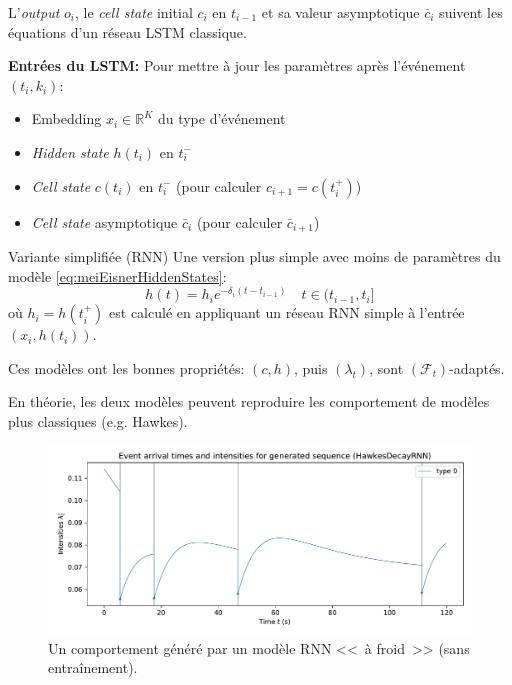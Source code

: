 \documentclass{beamer}
\newcommand{\RR}{\mathbb{R}}
\begin{document}
\begin{frame}
L'\textit{output} $o_i$, le \textit{cell state} initial $c_i$ en $t_{i-1}$ et sa valeur asymptotique $\overline{c}_i$ suivent les équations d'un réseau LSTM classique.

\textbf{Entrées du LSTM:} Pour mettre à jour les paramètres après l'événement $(t_i,k_i)$:\begin{itemize}
	\item[\textbullet] Embedding $x_i\in\RR^K$ du type d'événement
	\item[\textbullet] \textit{Hidden state} $h(t_{i})$ en $t_{i}^{-}$
	\item[\textbullet] \textit{Cell state} $c(t_{i})$ en $t_i^{-}$ (pour calculer $c_{i+1} = c(t_i^{+})$)
	\item[\textbullet] \textit{Cell state} asymptotique $\bar{c}_i$ (pour calculer $\bar{c}_{i+1}$)
\end{itemize}
\end{frame}


\begin{frame}{Variante simplifiée (RNN)}
Une version plus simple avec moins de paramètres du modèle \eqref{eq:meiEisnerHiddenStates}:
\begin{equation}
	h(t) = h_i e^{-\delta_i (t - t_{i-1})}
	\quad t\in (t_{i-1}, t_i]
\end{equation}
où $h_i = h(t_i^{+})$ est calculé en appliquant un réseau RNN simple à l'entrée $(x_i, h(t_i))$.

\end{frame}

\begin{frame}
Ces modèles ont les bonnes propriétés: $(c,h)$, puis $(\lambda_t)$, sont $(\mathcal{F}_t)$-adaptés.
\end{frame}

\begin{frame}
En théorie, les deux modèles peuvent reproduire les comportement de modèles plus classiques (e.g. Hawkes).

\begin{figure}
	\includegraphics[width=\linewidth]{../notebooks/example_rnnplot.pdf}
	\caption{Un comportement généré par un modèle RNN <<~à froid~>> (sans entraînement).}\label{fig:untrained1DRNNIntensity}
\end{figure}
	
\end{frame}
\end{document}
